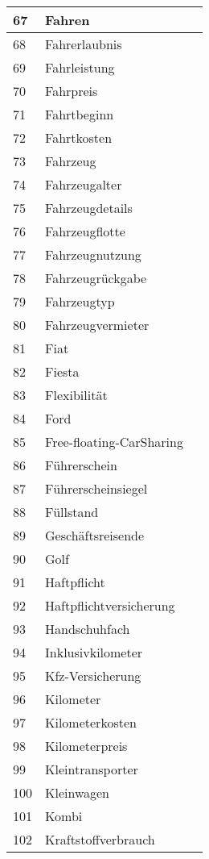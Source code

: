 \begin{longtable}{|m{1.5cm}|m{3cm}|m{8.5cm}|}
	\hline
	67 & Fahren & \\
	\hline
	68 & Fahrerlaubnis & \\
	\hline
	69 & Fahrleistung & \\
	\hline
	70 & Fahrpreis & \\
	\hline
	71 & Fahrtbeginn & \\
	\hline
	72 & Fahrtkosten & \\
	\hline
	73 & Fahrzeug & \\
	\hline
	74 & Fahrzeugalter & \\
	\hline
	75 & Fahrzeugdetails & \\
	\hline
	76 & Fahrzeugflotte & \\
	\hline
	77 & Fahrzeugnutzung & \\
	\hline
	78 & Fahrzeugrückgabe & \\
	\hline
	79 & Fahrzeugtyp & \\
	\hline
	80 & Fahrzeugvermieter & \\
	\hline
	81 & Fiat & \\
	\hline
	82 & Fiesta & \\
	\hline
	83 & Flexibilität & \\
	\hline
	84 & Ford & \\
	\hline
	85 & Free-floating-CarSharing & \\
	\hline
	86 & Führerschein & \\
	\hline
	87 & Führerscheinsiegel & \\
	\hline
	88 & Füllstand & \\
	\hline
	89 & Geschäftsreisende & \\
	\hline
	90 & Golf & \\
	\hline
	91 & Haftpflicht & \\
	\hline
	92 & Haftpflichtversicherung & \\
	\hline
	93 & Handschuhfach & \\
	\hline
	94 & Inklusivkilometer & \\
	\hline
	95 & Kfz-Versicherung & \\
	\hline
	96 & Kilometer & \\
	\hline
	97 & Kilometerkosten & \\
	\hline
	98 & Kilometerpreis & \\
	\hline
	99 & Kleintransporter & \\
	\hline
	100 & Kleinwagen & \\
	\hline
	101 & Kombi & \\
	\hline
	102 & Kraftstoffverbrauch & \\

\end{longtable}
